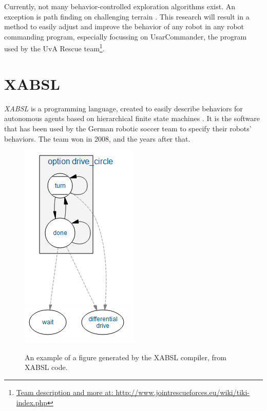 \documentclass[a4paper,10pt]{article}
\begin{document}
Currently, not many behavior-controlled exploration algorithms exist.
An exception is path finding on challenging terrain
\cite{seraji2002behavior} . This research will result in a method to
easily adjust and improve the behavior of any robot in any robot commanding
program, especially focussing on UsarCommander, the program used by the UvA Rescue
team\footnote{\url{Team description and more at: http://www.jointrescueforces.eu/wiki/tiki-index.php}}.

\section{XABSL}
\textit{XABSL} is a programming language, created to easily describe behaviors for autonomous agents
based on hierarchical finite state machines \cite{loetzsch2003xabsl}. It is the
software that has been used by the German robotic soccer team to specify their
robots' behaviors. The team won in 2008, and the years after that.

\begin{figure}
    \centering
        \includegraphics[width=.6\columnwidth]{../files/option_drive_circle.png}
    \label{fig:simpleFsm}
    \caption{An example of a figure generated by the XABSL compiler, from XABSL code.}
\end{figure}
\end{document}

